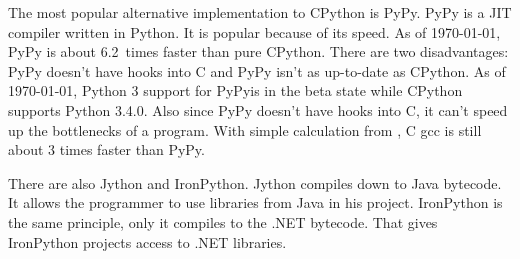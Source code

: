 {
\newcommand{\pypy}{PyPy}

The most popular alternative implementation to CPython is \pypy. \pypy{} is a JIT
compiler written in Python. It is popular because of its speed. As of \today,
\pypy{} is about 6.2~times faster than pure
CPython.\cite{website:python-pypy-speed} There are two disadvantages: \pypy{}
doesn't have hooks into C and PyPy isn't as up-to-date as CPython. As of \today,
Python 3 support for \pypy is in the beta state while CPython supports Python
3.4.0. Also since PyPy doesn't have hooks into C, it can't speed up the
bottlenecks of a program. With simple calculation from
\cite{website:c-vs-python,website:python-pypy-speed}, C gcc is still about 3
times faster than PyPy.
}


There are also Jython and IronPython. Jython compiles down to Java bytecode. It
allows the programmer to use libraries from Java in his project. IronPython is
the same principle, only it compiles to the .NET bytecode. That gives IronPython
projects access to .NET libraries.
